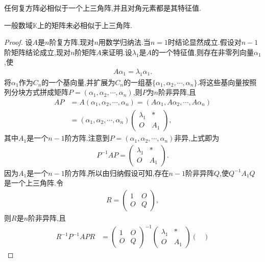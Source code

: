 \documentclass[lang=cn,newtx,10pt,scheme=chinese]{elegantbook}
\begin{document}
\begin{theorem}[复方阵必相似于上三角阵]\label{theorem:复方阵必相似于上三角阵}
任何复方阵必相似于一个上三角阵,并且对角元素都是其特征值.
\end{theorem}
\begin{remark}
一般数域$\mathbb{K}$上的矩阵未必相似于上三角阵.
\end{remark}
\begin{proof}
设$A$是$n$阶复方阵,现对$n$用数学归纳法.当$n=1$时结论显然成立.假设对$n-1$阶矩阵结论成立,现对$n$阶矩阵$A$来证明.设$\lambda_1$是$A$的一个特征值,则存在非零列向量$\alpha_1$,使
\begin{align*}
A \alpha_1 = \lambda_1 \alpha_1.
\end{align*}
将$\alpha_1$作为$C_n$的一个基向量,并扩展为$C_n$的一组基$\{\alpha_1, \alpha_2, \cdots, \alpha_n\}$.将这些基向量按照列分块方式拼成矩阵$P = (\alpha_1, \alpha_2, \cdots, \alpha_n)$,则$P$为$n$阶非异阵,且
\begin{align*}
AP &= A(\alpha_1, \alpha_2, \cdots, \alpha_n) = (A\alpha_1, A\alpha_2, \cdots, A\alpha_n) \\
&= (\alpha_1, \alpha_2, \cdots, \alpha_n) \begin{pmatrix}
\lambda_1 & * \\
O & A_1
\end{pmatrix},
\end{align*}
其中$A_1$是一个$n-1$阶方阵.注意到$P = (\alpha_1, \alpha_2, \cdots, \alpha_n)$非异,上式即为
\begin{align*}
P^{-1}AP = \begin{pmatrix}
\lambda_1 & * \\
O & A_1
\end{pmatrix}.
\end{align*}
因为$A_1$是一个$n-1$阶方阵,所以由归纳假设可知,存在$n-1$阶非异阵$Q$,使$Q^{-1}A_1Q$是一个上三角阵.令
\begin{align*}
R = \begin{pmatrix}
1 & O \\
O & Q
\end{pmatrix},
\end{align*}
则$R$是$n$阶非异阵,且
\begin{align*}
R^{-1}P^{-1}APR &= \begin{pmatrix}
1 & O \\
O & Q
\end{pmatrix}^{-1} \begin{pmatrix}
\lambda_1 & * \\
O & A_1
\end{pmatrix} \begin{pmatrix}

\end{pmatrix}
\end{align*}
\end{proof}
\end{document}
